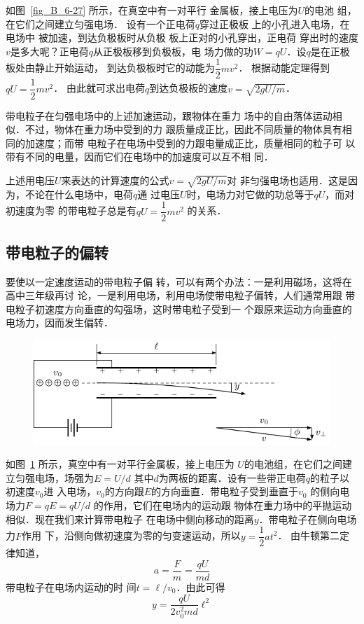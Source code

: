 如图~\ref{fig_B_6-27} 所示，在真空中有一对平行
金属板，接上电压为$U$的电池
组，在它们之间建立匀强电场．
设有一个正电荷$q$穿过正极板
上的小孔进入电场，在电场中
被加速，到达负极板时从负极
板上正对的小孔穿出，正电荷
穿出时的速度$v$是多大呢？正电荷$q$从正极板移到负极板，电
场力做的功$W=qU$．设$q$是在正极板处由静止开始运动，
到达负极板时它的动能为$\dfrac{1}{2}mv^2$．
根据动能定理得到$qU=\dfrac{1}{2}mv^2$．
由此就可求出电荷$q$到达负极板的速度$v=\sqrt{2gU/m}$．

带电粒子在匀强电场中的上述加速运动，跟物体在重力
场中的自由落体运动相似．不过，物体在重力场中受到的力
跟质量成正比，因此不同质量的物体具有相同的加速度；而带
电粒子在电场中受到的力跟电量成正比，质量相同的粒子可
以带有不同的电量，因而它们在电场中的加速度可以互不相
同．

上述用电压$U$来表达的计算速度的公式$v=\sqrt{2gU/m}$对
非匀强电场也适用．这是因为，不论在什么电场中，电荷$q$通
过电压$U$时，电场力对它做的功总等于$qU$，而对初速度为零
的带电粒子总是有$qU=\dfrac{1}{2}mv^2$
的关系．

\subsection{带电粒子的偏转}


要使以一定速度运动的带电粒子偏
转，可以有两个办法：一是利用磁场，这将在高中三年级再讨
论，一是利用电场，利用电场使带电粒子偏转，人们通常用跟
带电粒子初速度方向垂直的勾强场，这时带电粒子受到一
个跟原来运动方向垂直的电场力，因而发生偏转．
\begin{figure}[htbp]
    \centering
    \includegraphics{fig/B/6-28.pdf}
    \caption{}\label{fig_B_6-28}
\end{figure}

如图~\ref{fig_B_6-28} 所示，真空中有一对平行金属板，接上电压为
$U$的电池组，在它们之间建立匀强电场，场强为$E=U/d$
其中$d$为两板的距离．设有一些带正电荷$q$的粒子以初速度$v_0$进
入电场，$v_0$的方向跟$E$的方向垂直．带电粒子受到垂直于$v_0$
的侧向电场力$F=qE=qU/d$
的作用，它们在电场内的运动跟
物体在重力场中的平抛运动相似．现在我们来计算带电粒子
在电场中侧向移动的距离$y$．带电粒子在侧向电场力$F$作用
下，沿侧向做初速度为零的匀变速运动，所以$y=\dfrac{1}{2}at^2$．
由牛顿第二定律知道，
\[a=\frac{F}{m}=\frac{qU}{md} \]
带电粒子在电场内运动的时
间$t=\ell/v_0$．由此可得
\[y=\frac{qU}{2v^2_0 md}\ell^2 \]


